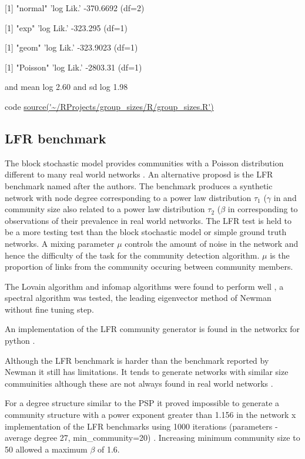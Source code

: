 [1] "normal" 
'log Lik.' -370.6692 (df=2)

[1] "exp"
'log Lik.' -323.295 (df=1)

[1] "geom"
'log Lik.' -323.9023 (df=1)

[1] "Poisson"
'log Lik.' -2803.31 (df=1)



and mean log 2.60 and sd log 1.98

code \url{source('~/RProjects/group_sizes/R/group_sizes.R')}
\subsection{LFR benchmark}

The block stochastic model provides communities with a Poisson distribution different to many real world networks . An alternative proposd is the LFR benchmark named after the authors. The benchmark produces a synthetic network with node degree corresponding to a power law distribution $\tau_1$ ($\gamma$ in \cite{lancichinetti2009community} and community size also related to a power law distribution $\tau_2$ ($\beta$ in \cite{lancichinetti2009community} corresponding to observations of their prevalence in real world networks. The LFR test is held to be a more testing test than the block stochastic model or simple ground truth networks. A mixing parameter $\mu$ controls the amount of noise in the network and hence the difficulty of the task for the community detection algorithm. $\mu$ is the proportion of links from the community occuring between community members. 

The Lovain algorithm and infomap algorithms were found to perform well \cite{lancichinetti2008benchmark} \cite{lancichinetti2009community}, a spectral algorithm was tested, the leading eigenvector method of Newman \cite{newman2006finding} without fine tuning step. 

An implementation of the LFR community generator is found in the networkx for python \cite{hagberg2008exploring}.

Although the LFR benchmark is harder than the benchmark reported by Newman it still has limitations. It tends to generate networks with similar size commuinities although these are not always found in real world networks \cite{orman2013towards} \cite{aldecoa2013exploring}. 

For a degree structure similar to the PSP it proved impossible to generate a community structure with a power exponent greater than 1.156 in the network x implementation of the LFR benchmarks using 1000 iterations (parameters - average degree 27, min\_community=20) .  Increasing minimum community size to 50 allowed a maximum $\beta$ of 1.6.

